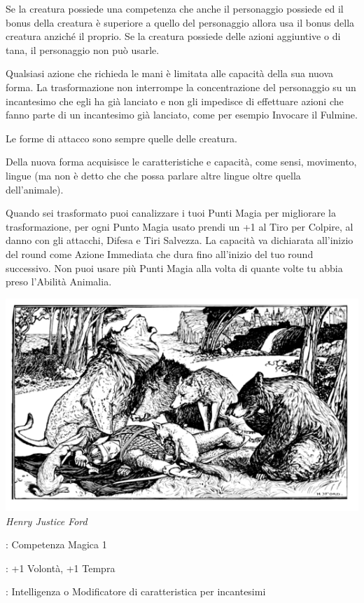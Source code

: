 \begin{multicols}{2}
Se la creatura possiede una competenza che anche il personaggio possiede ed il bonus della creatura è superiore a quello del personaggio allora usa il bonus della creatura anziché il proprio. Se la creatura possiede delle azioni aggiuntive o di tana, il personaggio non può usarle.

Qualsiasi azione che richieda le mani è limitata alle capacità della sua nuova forma. La trasformazione non interrompe la concentrazione del personaggio su un incantesimo che egli ha già lanciato e non gli impedisce di effettuare azioni che fanno parte di un incantesimo già lanciato, come per esempio Invocare il Fulmine.

Le forme di attacco sono sempre quelle delle creatura.

Della nuova forma acquisisce le caratteristiche e capacità, come sensi, movimento, lingue (ma non è detto che che possa parlare altre lingue oltre quella dell'animale).

Quando sei trasformato puoi canalizzare i tuoi Punti Magia per migliorare la trasformazione, per ogni Punto Magia usato prendi un +1 al Tiro per Colpire, al danno con gli attacchi, Difesa e Tiri Salvezza. La capacità va dichiarata all'inizio del round come Azione Immediata che dura fino all'inizio del tuo round successivo. Non puoi usare più Punti Magia alla volta di quante volte tu abbia preso l'Abilità Animalia.

\begin{center}
\includegraphics[width=0.9\linewidth]{immagini/animalia3.png}
\emph{Henry Justice Ford}
\end{center}

\begin{description}[noitemsep, topsep=0pt, parsep=0pt, partopsep=0pt, leftmargin=0cm, labelwidth=2.5cm]
    \item[\textbf{Requisito}]: Competenza Magica 1
    \item[\textbf{Tiri Salvezza}]: +1 Volontà, +1 Tempra
    \item[\textbf{Caratteristica}]: Intelligenza o Modificatore di caratteristica per incantesimi
\end{description}


\end{multicols}
